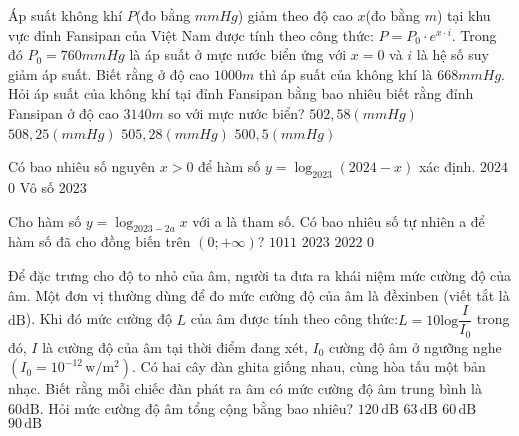 \begin{ex}
{}
\end{ex}
\begin{ex}
Áp suất không khí $P$(đo bằng $mmHg$) giảm theo độ cao $x$(đo bằng $m$) tại khu vực đỉnh Fansipan của Việt Nam được tính theo công thức: $P=P_0 \cdot {e^{x \cdot i}}$. Trong đó $P_0=760mmHg$ là áp suất ở mực nước biển ứng với $x=0$ và $i$ là hệ số suy giảm áp suất. Biết rằng ở độ cao $1000m$ thì áp suất của không khí là $668mmHg$. Hỏi áp suất của không khí tại đỉnh Fansipan bằng bao nhiêu biết rằng đỉnh Fansipan ở độ cao $3140m$ so với mực nước biển?
\choice
{$502{,}58(mmHg)$}
{$508{,}25(mmHg)$}
{$505{,}28(mmHg)$}
{$500{,}5(mmHg)$}
\end{ex}
\begin{ex}
Có bao nhiêu số nguyên $x>0$ để hàm số $y=\log_{2023}(2024-x)$ xác định.
\choice
{$2024$}
{$0$}
{Vô số}
{$2023$}
\end{ex}
\begin{ex}
Cho hàm số $y={{\log }_{2023-2a}}x$ với a là tham số. Có bao nhiêu số tự nhiên a để hàm số đã cho đồng biến trên $\left(0;+\infty\right)$?
\choice
{$1011$}
{$2023$}
{$2022$}
{$0$}
\end{ex}
\begin{ex}
Để đặc trưng cho độ to nhỏ của âm, người ta đưa ra khái niệm mức cường độ của âm. Một đơn vị thường dùng để đo mức cường độ của âm là đềxinben (viết tắt là $\text{dB}$). Khi đó mức cường độ $L$ của âm được tính theo công thức:$L=10\text{log}\dfrac{I}{I_0}$ trong đó, $I$ là cường độ của âm tại thời điểm đang xét, $I_0$ cường độ âm ở ngưỡng nghe$\left(I_0=10^{-12}\,\text{w}/{{\text{m}}^2}\right)$. Có hai cây đàn ghita giống nhau, cùng hòa tấu một bản nhạc. Biết rằng mỗi chiếc đàn phát ra âm có mức cường độ âm trung bình là $60\text{dB}$. Hỏi mức cường độ âm tổng cộng bằng bao nhiêu?
\choice
{$120\,\text{dB}$}
{$63\,\text{dB}$}
{$60\,\text{dB}$}
{$90\,\text{dB}$}
\end{ex}
